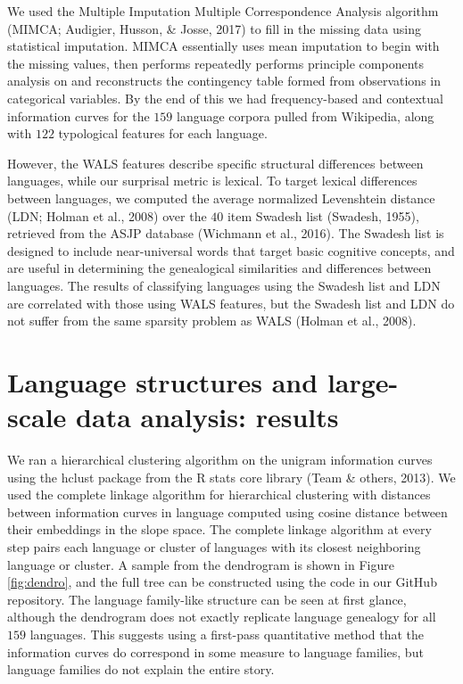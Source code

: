 \documentclass[11pt,]{article}
\begin{document}
We used the Multiple Imputation Multiple Correspondence Analysis algorithm (MIMCA; Audigier, Husson, \& Josse, 2017) to fill in the missing data using statistical imputation. MIMCA essentially uses mean imputation to begin with the missing values, then performs repeatedly performs principle components analysis on and reconstructs the contingency table formed from observations in categorical variables. By the end of this we had frequency-based and contextual information curves for the \(159\) language corpora pulled from Wikipedia, along with \(122\) typological features for each language.

However, the WALS features describe specific structural differences between languages, while our surprisal metric is lexical. To target lexical differences between languages, we computed the average normalized Levenshtein distance (LDN; Holman et al., 2008) over the \(40\) item Swadesh list (Swadesh, 1955), retrieved from the ASJP database (Wichmann et al., 2016). The Swadesh list is designed to include near-universal words that target basic cognitive concepts, and are useful in determining the genealogical similarities and differences between languages. The results of classifying languages using the Swadesh list and LDN are correlated with those using WALS features, but the Swadesh list and LDN do not suffer from the same sparsity problem as WALS (Holman et al., 2008).

\hypertarget{language-structures-and-large-scale-data-analysis-results}{%
\section{Language structures and large-scale data analysis: results}\label{language-structures-and-large-scale-data-analysis-results}}

We ran a hierarchical clustering algorithm on the unigram information curves using the hclust package from the R stats core library (Team \& others, 2013). We used the complete linkage algorithm for hierarchical clustering with distances between information curves in language computed using cosine distance between their embeddings in the slope space. The complete linkage algorithm at every step pairs each language or cluster of languages with its closest neighboring language or cluster. A sample from the dendrogram is shown in Figure \ref{fig:dendro}, and the full tree can be constructed using the code in our GitHub repository. The language family-like structure can be seen at first glance, although the dendrogram does not exactly replicate language genealogy for all \(159\) languages. This suggests using a first-pass quantitative method that the information curves do correspond in some measure to language families, but language families do not explain the entire story.
\end{document}
